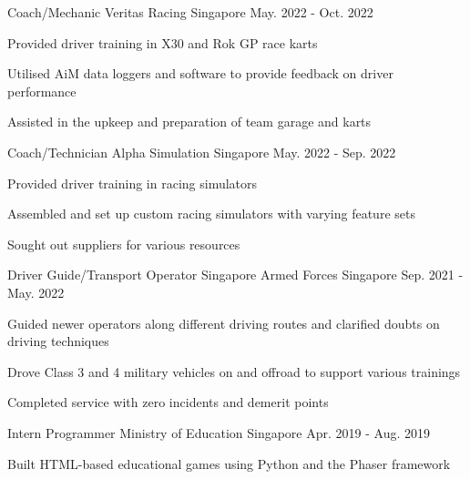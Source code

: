 

\begin{cventries}

  \cventry
    {Coach/Mechanic} %
    {Veritas Racing} %
    {Singapore} %
    {May. 2022 - Oct. 2022} %
    {
      \begin{cvitems} %
        \item {Provided driver training in X30 and Rok GP race karts}
        \item {Utilised AiM data loggers and software to provide feedback on driver performance}
        \item {Assisted in the upkeep and preparation of team garage and karts}
      \end{cvitems}
    }

  \cventry
    {Coach/Technician} %
    {Alpha Simulation} %
    {Singapore} %
    {May. 2022 - Sep. 2022} %
    {
      \begin{cvitems} %
        \item {Provided driver training in racing simulators}
        \item {Assembled and set up custom racing simulators with varying feature sets}
        \item {Sought out suppliers for various resources}
      \end{cvitems}
    }

  \cventry
    {Driver Guide/Transport Operator} %
    {Singapore Armed Forces} %
    {Singapore} %
    {Sep. 2021 - May. 2022} %
    {
      \begin{cvitems} %
        \item {Guided newer operators along different driving routes and clarified doubts on driving techniques}
        \item {Drove Class 3 and 4 military vehicles on and offroad to support various trainings}
        \item {Completed service with zero incidents and demerit points}
      \end{cvitems}
    }

  \cventry
    {Intern Programmer} %
    {Ministry of Education} %
    {Singapore} %
    {Apr. 2019 - Aug. 2019} %
    {
      \begin{cvitems} %
        \item {Built HTML-based educational games using Python and the Phaser framework}
      \end{cvitems}
    }
\end{cventries}
